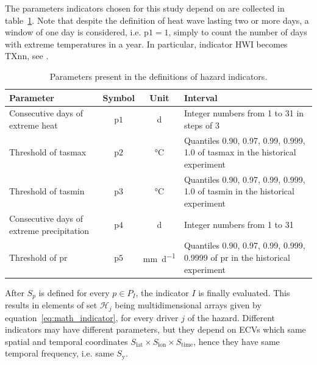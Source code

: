 The parameters indicators chosen for this study depend on are collected in table~\ref{tab:indicators_parameters}. Note that despite the definition of heat wave lasting two or more days, a window of one day is considered, i.e. $\mathrm{p1} = 1$, simply to count the number of days with extreme temperatures in a year. In particular, indicator $\mathrm{HWI}$ becomes $\mathrm{TXnn}$, see \cite[2209]{2021GutierrezAnnexVI}.
\begin{table}[h]
  \renewcommand*{\arraystretch}{1.5}
  \centering
  \caption{Parameters present in the definitions of hazard indicators.}
  \label{tab:indicators_parameters}
  \begin{tabular}{p{}ccp{}}
    Parameter                                  & Symbol        & Unit                        & Interval                                                                               \\
    \hline
    Consecutive days of extreme heat           & $\mathrm{p1}$ & \unit{\day}                 & Integer numbers from 1 to 31 in steps of 3                                             \\  %
    Threshold of \gls{tasmax}                  & $\mathrm{p2}$ & \unit{\degreeCelsius}       & Quantiles 0.90, 0.97, 0.99, 0.999, 1.0 of \gls{tasmax} in the historical experiment    \\
    Threshold of \gls{tasmin}                  & $\mathrm{p3}$ & \unit{\degreeCelsius}       & Quantiles 0.90, 0.97, 0.99, 0.999, 1.0 of \gls{tasmin} in the historical experiment    \\
    Consecutive days of extreme precipitation  & $\mathrm{p4}$ & \unit{\day}                 & Integer numbers from 1 to 31                                                           \\  %
    Threshold of \gls{pr}                      & $\mathrm{p5}$ & \unit{\milli\metre\per\day} & Quantiles 0.90, 0.97, 0.99, 0.999, 0.9999 of \gls{pr} in the historical experiment     \\
  \end{tabular}
\end{table}

After $S_p$ is defined for every $p \in P_I$, the \gls{indicator} $I$ is finally evaluated. This results in elements of set $\mathcal{H}_j$ being multidimensional arrays given by equation~\eqref{eq:math_indicator}, for every \gls{driver} $j$ of the \gls{hazard}. Different \glspl{indicator} may have different parameters, but they depend on \glspl{ECV} which same spatial and temporal coordinates $S_\text{lat} \times S_\text{lon} \times S_\text{time}$, hence they have same temporal frequency, i.e. same $S_\text{y}$.

